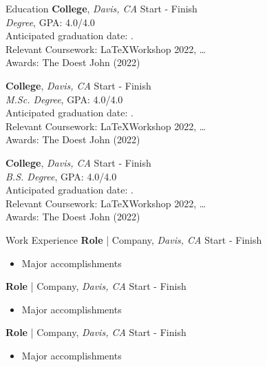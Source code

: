 \documentclass[10pt]{resume} %
\begin{document}
\vspace*{-2mm}
\begin{rSection}{Education}
	{\bf College}, \emph{Davis, CA} \hfill {Start - Finish}\\
	\emph{Degree}, GPA: 4.0/4.0\\ 
	Anticipated graduation date: .\\
	\hspace*{5mm} {\small Relevant Coursework: \LaTeX Workshop 2022, \ldots}\\ 
	\hspace*{5mm} {\small Awards: The Doest John (2022)}
	
	{\bf College}, \emph{Davis, CA} \hfill {Start - Finish}\\
	\emph{M.Sc. Degree}, GPA: 4.0/4.0\\ 
	Anticipated graduation date: .\\
	\hspace*{5mm} {\small Relevant Coursework: \LaTeX Workshop 2022, \ldots}\\ 
	\hspace*{5mm} {\small Awards: The Doest John (2022)}
	
	{\bf College}, \emph{Davis, CA} \hfill {Start - Finish}\\
	\emph{B.S. Degree}, GPA: 4.0/4.0\\ 
	Anticipated graduation date: .\\
	\hspace*{5mm} {\small Relevant Coursework: \LaTeX Workshop 2022, \ldots}\\ 
	\hspace*{5mm} {\small Awards: The Doest John (2022)}
\end{rSection}




\newpage
\begin{rSection}{Work Experience}
	{\bf Role} | Company, \emph{Davis, CA} \hfill {Start - Finish}
	\begin{itemize}
		\item{Major accomplishments}
	\end{itemize}
	{\bf Role} | Company, \emph{Davis, CA} \hfill {Start - Finish}
	\begin{itemize}
		\item{Major accomplishments}
	\end{itemize}{\bf Role} | Company, \emph{Davis, CA} \hfill {Start - Finish}
\begin{itemize}
\item{Major accomplishments}
\end{itemize}	
\end{rSection}
\end{document}

